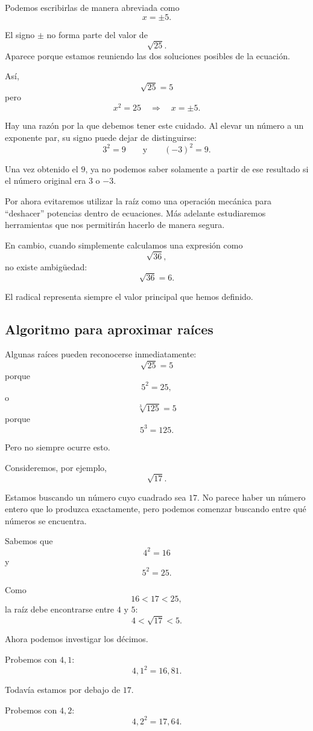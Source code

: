 Podemos escribirlas de manera abreviada como
\[
x=\pm5.
\]

El signo \(\pm\) no forma parte del valor de
\[
\sqrt{25}.
\]
Aparece porque estamos reuniendo las dos soluciones posibles de la ecuación.

Así,
\[
\boxed{\sqrt{25}=5}
\]
pero
\[
\boxed{x^2=25\quad\Longrightarrow\quad x=\pm5}.
\]

Hay una razón por la que debemos tener este cuidado. Al elevar un número a un exponente par, su signo puede dejar de distinguirse:
\[
3^2=9
\qquad\text{y}\qquad
(-3)^2=9.
\]

Una vez obtenido el \(9\), ya no podemos saber solamente a partir de ese resultado si el número original era \(3\) o \(-3\).

Por ahora evitaremos utilizar la raíz como una operación mecánica para ``deshacer'' potencias dentro de ecuaciones. Más adelante estudiaremos herramientas que nos permitirán hacerlo de manera segura.

En cambio, cuando simplemente calculamos una expresión como
\[
\sqrt{36},
\]
no existe ambigüedad:
\[
\sqrt{36}=6.
\]

El radical representa siempre el valor principal que hemos definido.


\subsection{Algoritmo para aproximar raíces}

Algunas raíces pueden reconocerse inmediatamente:
\[
\sqrt{25}=5
\]
porque
\[
5^2=25,
\]
o
\[
\sqrt[3]{125}=5
\]
porque
\[
5^3=125.
\]

Pero no siempre ocurre esto.

Consideremos, por ejemplo,
\[
\sqrt{17}.
\]

Estamos buscando un número cuyo cuadrado sea \(17\). No parece haber un número entero que lo produzca exactamente, pero podemos comenzar buscando entre qué números se encuentra.

Sabemos que
\[
4^2=16
\]
y
\[
5^2=25.
\]

Como
\[
16<17<25,
\]
la raíz debe encontrarse entre \(4\) y \(5\):
\[
4<\sqrt{17}<5.
\]

Ahora podemos investigar los décimos.

Probemos con \(4{,}1\):
\[
4{,}1^2=16{,}81.
\]

Todavía estamos por debajo de \(17\).

Probemos con \(4{,}2\):
\[
4{,}2^2=17{,}64.
\]

